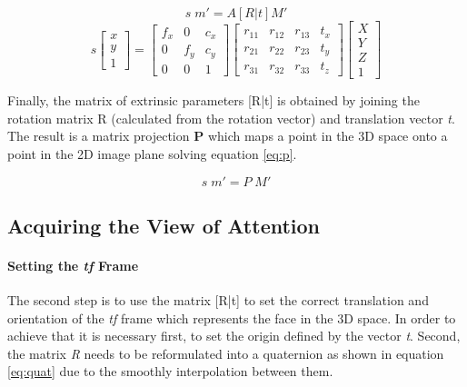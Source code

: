 \documentclass{sig-alternate}
\begin{document}
\begin{equation}
s  \; m' = A [R|t] M'
\label{eq:pinHole}
\end{equation}
\begin{equation}
s
\begin{bmatrix}
x \\
y \\
1
\end{bmatrix}
=
\begin{bmatrix}
f_x & 0 & c_x  \\
0 & f_y & c_y  \\
0 & 0 & 1 
\end{bmatrix}
\begin{bmatrix}
r_{11} & r_{12} & r_{13} & t_x  \\
r_{21} & r_{22} & r_{23} & t_y  \\
r_{31} & r_{32} & r_{33} & t_z  
\end{bmatrix}
\begin{bmatrix}
X \\
Y \\
Z \\
1
\end{bmatrix}
\label{eq:pinHole2}
\end{equation}

Finally, the matrix of extrinsic parameters [R|t] is obtained by joining the
rotation matrix R (calculated from the rotation vector) and translation vector
\textit{t}. The result is a matrix projection \textbf{P} which maps a point in
the 3D space onto a point in the 2D image plane solving equation \ref{eq:p}.

\begin{equation}
s  \; m' = P \; M'
\label{eq:p}
\end{equation}

\subsection{Acquiring the View of Attention}

\paragraph{Setting the \textit{tf} Frame}
The second step is to use the matrix [R|t] to set the correct translation and
orientation of the \textit{tf} frame which represents the face in the 3D space.
In order to achieve that it is necessary first, to set the origin defined by the
vector \textit{t}. Second, the matrix \textit{R} needs to be reformulated into a
quaternion as shown in equation \ref{eq:quat} due to the smoothly interpolation
between them.
\end{document}
